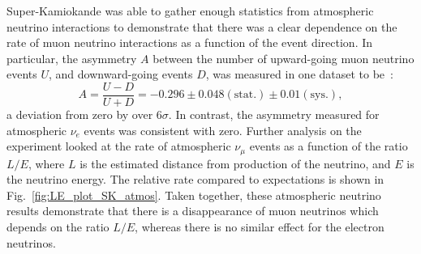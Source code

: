 Super-Kamiokande was able to gather enough statistics from atmospheric neutrino interactions to demonstrate that there was a clear dependence on the rate of muon neutrino interactions as a function of the event direction. In particular, the asymmetry $A$ between the number of upward-going muon neutrino events $U$, and downward-going events $D$, was measured in one dataset to be~\cite{fukudaEvidenceOscillationAtmospheric1998}: %
\begin{equation*}
    A = \frac{U-D}{U+D} = -0.296 \pm 0.048(\mathrm{stat.}) \pm 0.01(\mathrm{sys.}),
\end{equation*}
a deviation from zero by over 6$\sigma$. In contrast, the asymmetry measured for atmospheric $\nu_{e}$ events was consistent with zero. Further analysis on the experiment looked at the rate of atmospheric $\nu_{\mu}$ events as a function of the ratio $L/E$, where $L$ is the estimated distance from production of the neutrino, and $E$ is the neutrino energy. The relative rate compared to expectations is shown in Fig.~\ref{fig:LE_plot_SK_atmos}. Taken together, these atmospheric neutrino results demonstrate that there is a disappearance of muon neutrinos which depends on the ratio $L/E$, whereas there is no similar effect for the electron neutrinos.

